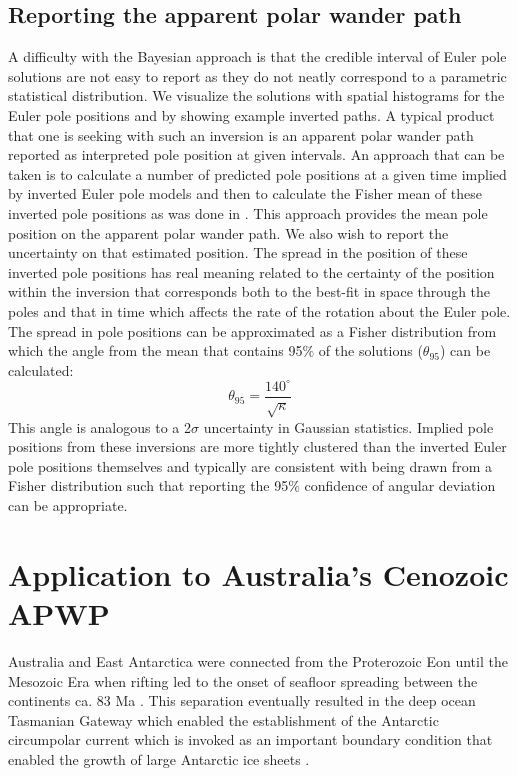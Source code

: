 \documentclass[11pt,letterpaper]{article}
\begin{document}
\subsection*{Reporting the apparent polar wander path}
\label{sec:age_uncertainty}
A difficulty with the Bayesian approach is that the credible interval of Euler pole solutions are not easy to report as they do not neatly correspond to a parametric statistical distribution. We visualize the solutions with spatial histograms for the Euler pole positions and by showing example inverted paths. A typical product that one is seeking with such an inversion is an apparent polar wander path reported as interpreted pole position at given intervals. An approach that can be taken is to calculate a number of predicted pole positions at a given time implied by inverted Euler pole models and then to calculate the Fisher mean of these inverted pole positions as was done in \citet{Swanson-Hysell2019a}. This approach provides the mean pole position on the apparent polar wander path. We also wish to report the uncertainty on that estimated position. The spread in the position of these inverted pole positions has real meaning related to the certainty of the position within the inversion that corresponds both to the best-fit in space through the poles and that in time which affects the rate of the rotation about the Euler pole. The spread in pole positions can be approximated as a Fisher distribution from which the angle from the mean that contains 95$\%$ of the solutions ($\theta_{95}$) can be calculated:
\begin{equation}
\theta_{95}=\frac{140^{\circ}}{\sqrt{\kappa}}
\label{eq:angular_deviation}
\end{equation}
This angle is analogous to a 2$\sigma$ uncertainty in Gaussian statistics. Implied pole positions from these inversions are more tightly clustered than the inverted Euler pole positions themselves and typically are consistent with being drawn from a Fisher distribution such that reporting the 95$\%$ confidence of angular deviation can be appropriate.

\section*{Application to Australia's Cenozoic APWP}
\label{sec:australia}

Australia and East Antarctica were connected from the Proterozoic Eon until the Mesozoic Era when rifting led to the onset of seafloor spreading between the continents ca. 83 Ma \citep{Williams2011a, Veevers2012a}. This separation eventually resulted in the deep ocean Tasmanian Gateway which enabled the establishment of the Antarctic circumpolar current which is invoked as an important boundary condition that enabled the growth of large Antarctic ice sheets \citep{Stickley2004a}. 
\end{document}
